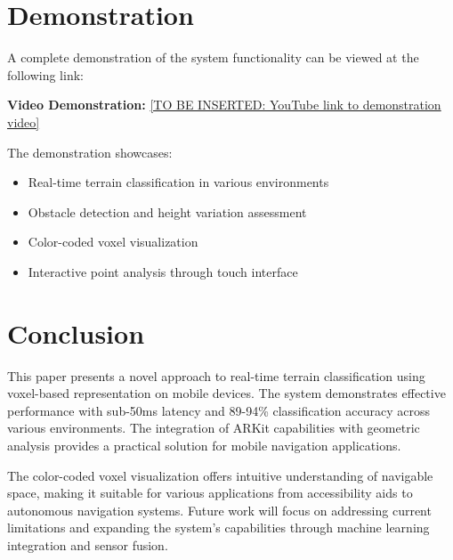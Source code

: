 \documentclass[conference]{IEEEtran}
\begin{document}
\section{Demonstration}

A complete demonstration of the system functionality can be viewed at the following link:

\textbf{Video Demonstration:} \url{[TO BE INSERTED: YouTube link to demonstration video]}

The demonstration showcases:
\begin{itemize}
    \item Real-time terrain classification in various environments
    \item Obstacle detection and height variation assessment
    \item Color-coded voxel visualization
    \item Interactive point analysis through touch interface
\end{itemize}

\section{Conclusion}

This paper presents a novel approach to real-time terrain classification using voxel-based representation on mobile devices. The system demonstrates effective performance with sub-50ms latency and 89-94\% classification accuracy across various environments. The integration of ARKit capabilities with geometric analysis provides a practical solution for mobile navigation applications.

The color-coded voxel visualization offers intuitive understanding of navigable space, making it suitable for various applications from accessibility aids to autonomous navigation systems. Future work will focus on addressing current limitations and expanding the system's capabilities through machine learning integration and sensor fusion.
\end{document}
